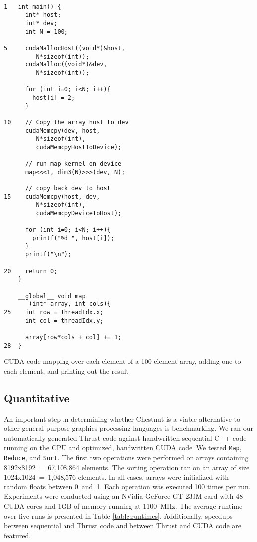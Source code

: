 \documentclass[twocolumn]{article}
\renewcommand{\|}{\origbar} %
\newcommand{\code}[1]{\texttt{#1}}
\begin{document}
\begin{Code Snippet}
\begin{verbatim}

1   int main() {
      int* host;
      int* dev;
      int N = 100;
 
5     cudaMallocHost((void*)&host, 
         N*sizeof(int));
      cudaMalloc((void*)&dev, 
         N*sizeof(int));
  
      for (int i=0; i<N; i++){
        host[i] = 2;
      }

10    // Copy the array host to dev
      cudaMemcpy(dev, host, 
         N*sizeof(int),
         cudaMemcpyHostToDevice);

      // run map kernel on device
      map<<<1, dim3(N)>>>(dev, N);

      // copy back dev to host
15    cudaMemcpy(host, dev, 
         N*sizeof(int),
         cudaMemcpyDeviceToHost);
  
      for (int i=0; i<N; i++){
        printf("%d ", host[i]);
      }
      printf("\n");
  
20    return 0;
    }

    __global__ void map
       (int* array, int cols){
25    int row = threadIdx.x;
      int col = threadIdx.y;
   
      array[row*cols + col] += 1;
28  }                                    
\end{verbatim}
\caption{CUDA code mapping over each element of a 100 element array, adding one to each element, and printing out the result}
\label{code:cudaExperiment}
\end{Code Snippet}

\subsection{Quantitative}

An important step in determining whether Chestnut is a viable alternative to other general purpose graphics processing languages is benchmarking. We ran our automatically generated Thrust code against handwritten sequential C++ code running on the CPU and optimized, handwritten CUDA code. We tested \code{Map}, \code{Reduce}, and \code{Sort}. The first two operations were performed on arrays containing 8192x8192~=~67,108,864 elements. The sorting operation ran on an array of size 1024x1024~=~1,048,576 elements. In all cases, arrays were initialized with random floats between 0~and~1. Each operation was executed 100 times per run. Experiments were conducted using an NVidia GeForce GT 230M card with 48 CUDA cores and 1GB of memory running at 1100~MHz. The average runtime over five runs is presented in Table \ref{table:runtimes}. Additionally, speedups between sequential and Thrust code and between Thrust and CUDA code are featured.
\end{document}
